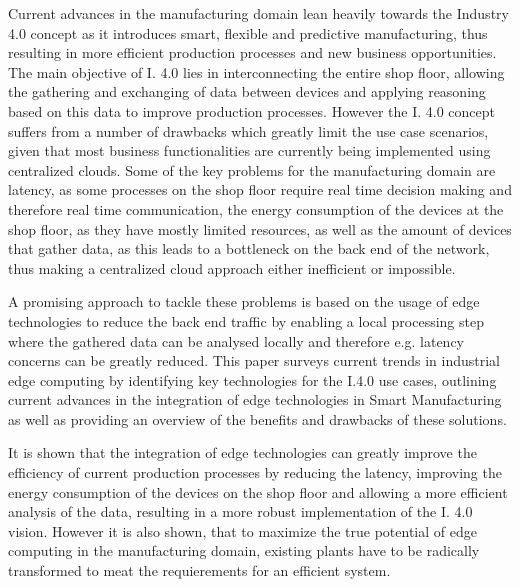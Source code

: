 Current advances in the manufacturing domain lean heavily towards the Industry 4.0 concept as it introduces smart, flexible and predictive manufacturing, thus resulting in more efficient production processes and new business opportunities. The main objective of I. 4.0 lies in interconnecting the entire shop floor, allowing the gathering and exchanging of data between devices and applying reasoning based on this data to improve production processes. However the I. 4.0 concept suffers from a number of drawbacks which greatly limit the use case scenarios, given that most business functionalities are currently being implemented using centralized clouds. Some of the key problems for the manufacturing domain are latency, as some processes on the shop floor require real time decision making and therefore real time communication, the energy consumption of the devices at the shop floor, as they have mostly limited resources, as well as the amount of devices that gather data, as this leads to a bottleneck on the back end of the network, thus making a centralized cloud approach either inefficient or impossible.

A promising approach to tackle these problems is based on the usage of edge technologies to reduce the back end traffic by enabling a local processing step where the gathered data can be analysed locally and therefore e.g. latency concerns can be greatly reduced. This paper surveys current trends in industrial edge computing by identifying key technologies for the I.4.0 use cases, outlining current advances in the integration of edge technologies in Smart Manufacturing as well as providing an overview of the benefits and drawbacks of these solutions.

It is shown that the integration of edge technologies can greatly improve the efficiency of current production processes by reducing the latency, improving the energy consumption of the devices on the shop floor and allowing a more efficient analysis of the data, resulting in a more robust implementation of the I. 4.0 vision. However it is also shown, that to maximize the true potential of edge computing in the manufacturing domain, existing plants have to be radically transformed to meat the requierements for an efficient system.
